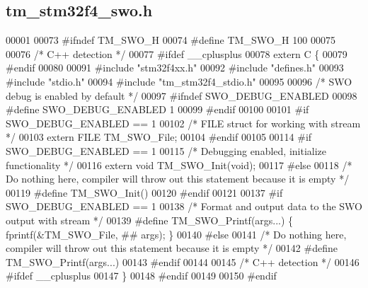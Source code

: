 \hypertarget{tm__stm32f4__swo_8h_source}{}\subsection{tm\+\_\+stm32f4\+\_\+swo.\+h}

\begin{DoxyCode}
00001 
00073 \textcolor{preprocessor}{#ifndef TM\_SWO\_H}
00074 \textcolor{preprocessor}{#define TM\_SWO\_H 100}
00075 
00076 \textcolor{comment}{/* C++ detection */}
00077 \textcolor{preprocessor}{#ifdef \_\_cplusplus}
00078 \textcolor{keyword}{extern} C \{
00079 \textcolor{preprocessor}{#endif}
00080 
00091 \textcolor{preprocessor}{#include "stm32f4xx.h"}
00092 \textcolor{preprocessor}{#include "defines.h"}
00093 \textcolor{preprocessor}{#include "stdio.h"}
00094 \textcolor{preprocessor}{#include "tm\_stm32f4\_stdio.h"}
00095 
00096 \textcolor{comment}{/* SWO debug is enabled by default */}
00097 \textcolor{preprocessor}{#ifndef SWO\_DEBUG\_ENABLED}
00098 \textcolor{preprocessor}{#define SWO\_DEBUG\_ENABLED       1}
00099 \textcolor{preprocessor}{#endif}
00100 
00101 \textcolor{preprocessor}{#if SWO\_DEBUG\_ENABLED == 1}
00102     \textcolor{comment}{/* FILE struct for working with stream */}
00103     \textcolor{keyword}{extern} FILE TM\_SWO\_File;
00104 \textcolor{preprocessor}{#endif}
00105 
00114 \textcolor{preprocessor}{#if SWO\_DEBUG\_ENABLED == 1}
00115     \textcolor{comment}{/* Debugging enabled, initialize functionality */}
00116     \textcolor{keyword}{extern} \textcolor{keywordtype}{void} TM\_SWO\_Init(\textcolor{keywordtype}{void});
00117 \textcolor{preprocessor}{#else}
00118     \textcolor{comment}{/* Do nothing here, compiler will throw out this statement because it is empty */}
00119 \textcolor{preprocessor}{    #define TM\_SWO\_Init()}
00120 \textcolor{preprocessor}{#endif}
00121 
00137 \textcolor{preprocessor}{#if SWO\_DEBUG\_ENABLED == 1}
00138     \textcolor{comment}{/* Format and output data to the SWO output with stream */}
00139 \textcolor{preprocessor}{    #define TM\_SWO\_Printf(args...)  \{ fprintf(&TM\_SWO\_File, ## args); \}}
00140 \textcolor{preprocessor}{#else}
00141     \textcolor{comment}{/* Do nothing here, compiler will throw out this statement because it is empty */}
00142 \textcolor{preprocessor}{    #define TM\_SWO\_Printf(args...) }
00143 \textcolor{preprocessor}{#endif}
00144 
00145 \textcolor{comment}{/* C++ detection */}
00146 \textcolor{preprocessor}{#ifdef \_\_cplusplus}
00147 \}
00148 \textcolor{preprocessor}{#endif}
00149 
00150 \textcolor{preprocessor}{#endif}
\end{DoxyCode}
